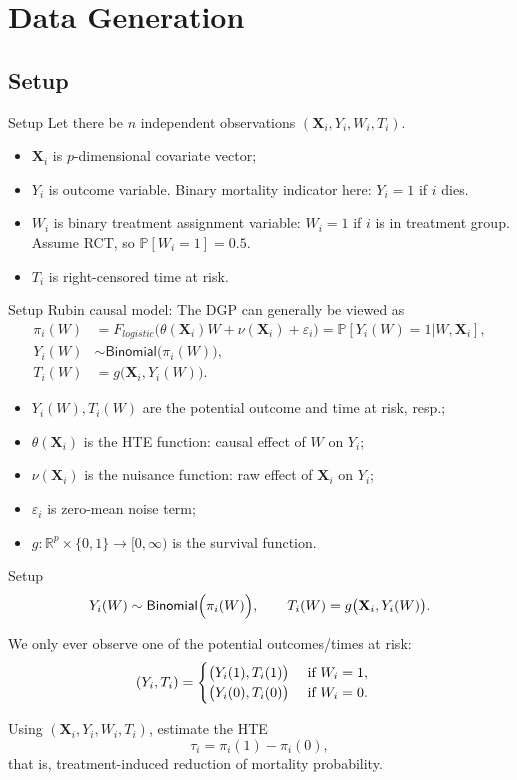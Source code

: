 \documentclass[11pt]{beamer}
\newcommand{\X}{\mathbf{X}}
\renewcommand{\P}{\mathbb{P}}
\begin{document}
\section{Data Generation}
\subsection{Setup}

\begin{frame}{Setup}
Let there be $n$ independent observations $(\X_i, Y_i, W_i, T_i)$.
\begin{itemize}\setlength\itemsep{1em}
	\item $\X_i$ is $p$-dimensional covariate vector;
	\item $Y_i$ is outcome variable. Binary mortality indicator here: $Y_i=1$ if $i$ dies.
	\item $W_i$ is binary treatment assignment variable: $W_i = 1$ if $i$ is in treatment group. Assume RCT, so $\P[W_i=1]=0.5$.
	\item $T_i$ is right-censored time at risk.
\end{itemize}
\end{frame}


\begin{frame}{Setup}
Rubin causal model: The DGP can generally be viewed as
\begin{align*}
	\pi_i(W) &= F_{logistic}\Bigg( \theta(\X_i)W +  \nu (\X_i) + \varepsilon_i \Bigg) = \P[Y_i(W)=1 | W, \X_i],\\
	Y_i(W) &\sim \textsf{Binomial}\Big( \pi_i(W) \Big),\\
	T_i(W) &= g\big(\X_i, Y_i(W)\big).
\end{align*}
	
\begin{itemize}
	\item $Y_i(W), T_i(W)$ are the potential outcome and time at risk, resp.;
	\item $\theta(\X_i)$ is the HTE function: causal effect of $W$ on $Y_i$;
	\item $\nu(\X_i)$ is the nuisance function: raw effect of $\X_i$ on $Y_i$;
	\item $\varepsilon_i$ is zero-mean noise term;
	\item $g:\mathbb{R}^p \times \{0,1\}\to[0,\infty)$ is the survival function.
\end{itemize}
\end{frame}


\begin{frame}{Setup}
\[
	Y_i(W) \sim \textsf{Binomial}\Big( \pi_i(W) \Big), \qquad
	T_i(W) = g\big(\X_i, Y_i(W)\big).\bigskip
\]

We only ever observe one of the potential outcomes/times at risk:
\[
	(Y_i, T_i)
	=
	\begin{cases}
	\big(Y_i(1), T_i(1)\big) \quad \text{ if } W_i = 1,\\
	\big(Y_i(0), T_i(0)\big) \quad \text{ if } W_i = 0.
	\end{cases}\bigskip
\]

Using $(\X_i, Y_i, W_i, T_i)$, estimate the HTE 
\[
\tau_i=\pi_i(1)-\pi_i(0),
\]
that is, treatment-induced reduction of mortality probability. 
\end{frame}
\end{document}
